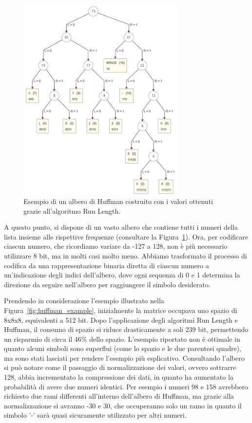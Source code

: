 \documentclass[a4paper,12pt, oneside]{article}
\begin{document}
\begin{figure}[h]
    \centering
    \includegraphics[width=0.75\textwidth]{images/huffman-tree.png}
    \caption{Esempio di un albero di Huffman costruito con i valori ottenuti grazie all'algoritmo
    Run Length.}
    \label{fig:huffman_tree}
\end{figure}

A questo punto, si dispone di un vasto albero che contiene tutti i numeri della lista insieme alle
rispettive frequenze (consultare la Figura~\ref{fig:huffman_tree}). Ora, per codificare ciascun numero,
che ricordiamo variare da -127 a 128, non è più necessario utilizzare 8 bit, ma in molti casi molto
meno. Abbiamo trasformato il processo di codifica da una rappresentazione binaria diretta di ciascun
numero a un'indicazione degli indici dell'albero, dove ogni sequenza di 0 e 1 determina la direzione
da seguire nell'albero per raggiungere il simbolo desiderato.

Prendendo in considerazione l'esempio illustrato nella Figura~\ref{fig:huffman_example}, inizialmente
la matrice occupava uno spazio di 8x8x8, equivalenti a 512 bit. Dopo l'applicazione degli algoritmi
Run Length e Huffman, il consumo di spazio si riduce drasticamente a soli 239 bit, permettendo un
risparmio di circa il 46\% dello spazio. L'esempio riportato non è ottimale in quanto alcuni simboli
sono superflui (come lo spazio e le due parentesi quadre), ma sono stati lasciati per rendere
l'esempio più esplicativo. Consultando l'albero si può notare come il passaggio di normalizzazione
dei valori, ovvero sottrarre 128, abbia incrementato la compressione dei dati, in quanto ha aumentato
la probabilità di avere due numeri identici. Per esempio i numeri 98 e 158 avrebbero richiesto due
rami differenti all'interno dell'albero di Huffman, ma grazie alla normalizzazione si avranno -30 e
30, che occuperanno solo un ramo in quanto il simbolo '-' sarà quasi sicuramente utilizzato per altri
numeri.
\end{document}
